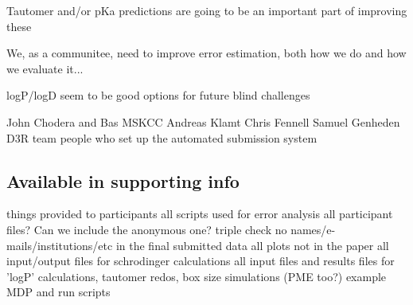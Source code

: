 Tautomer and/or pKa predictions are going to be an important part of improving these

We, as a communitee, need to improve error estimation, both how we do and how we evaluate it...

logP/logD seem to be good options for future blind challenges

\begin{acknowledgements} %
John Chodera and Bas MSKCC
Andreas Klamt
Chris Fennell
Samuel Genheden
D3R team
people who set up the automated submission system %


\end{acknowledgements}

\subsection{Available in supporting info} %
things provided to participants
all scripts used for error analysis
all participant files? Can we include the anonymous one? 
triple check no names/e-mails/institutions/etc in the final submitted data
all plots not in the paper
all input/output files for schrodinger calculations
all input files and results files for 'logP' calculations, tautomer redos, box size simulations (PME too?) 
example MDP and run scripts
 




